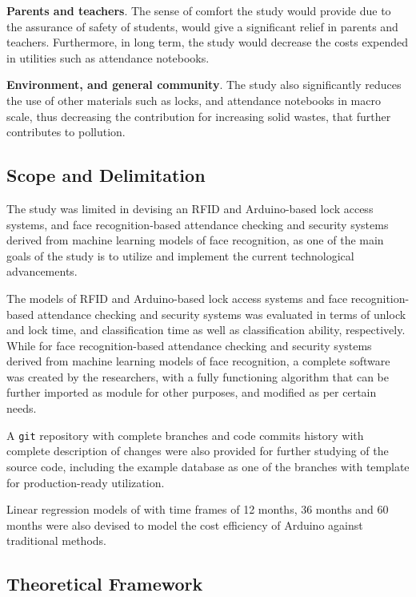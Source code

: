 \documentclass[12pt]{article}
\begin{document}
\textbf{Parents and teachers}. The sense of comfort the study would provide due to the assurance of safety of students, would give a significant relief in parents and teachers. Furthermore, in long term, the study would decrease the costs expended in utilities such as attendance notebooks.

\textbf{Environment, and general community}. The study also significantly reduces the use of other materials such as locks, and attendance notebooks in macro scale, thus decreasing the contribution for increasing solid wastes, that further contributes to pollution.

\subsection*{Scope and Delimitation\centering}

The study was limited in devising an RFID and Arduino-based lock access systems, and face recognition-based attendance checking and security systems derived from machine learning models of face recognition, as one of the main goals of the study is to utilize and implement the current technological advancements.

The models of RFID and Arduino-based lock access systems and face recognition-based attendance checking and security systems was evaluated in terms of unlock and lock time, and classification time as well as classification ability, respectively. While for face recognition-based attendance checking and security systems derived from machine learning models of face recognition, a complete software was created by the researchers, with a fully functioning algorithm that can be further imported as module for other purposes, and modified as per certain needs.

A \texttt{git} repository with complete branches and code commits  history with complete description of changes were also provided for further studying of the source code, including the example database as one of the branches with template for production-ready utilization.

Linear regression models of with time frames of 12 months, 36 months and 60 months were also devised to model the cost efficiency of Arduino against traditional methods. 

\subsection*{Theoretical Framework\centering}
\end{document}
